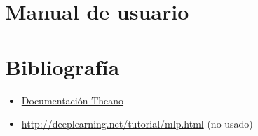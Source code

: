 \documentclass[10pt,a4paper]{article}
\begin{document}
\section{Manual de usuario}

\section{Bibliografía}

\begin{itemize}
	\item \href{http://deeplearning.net/software/theano/index.html}{Documentación Theano}
	\item \url{http://deeplearning.net/tutorial/mlp.html} (no usado)
\end{itemize}
\end{document}
